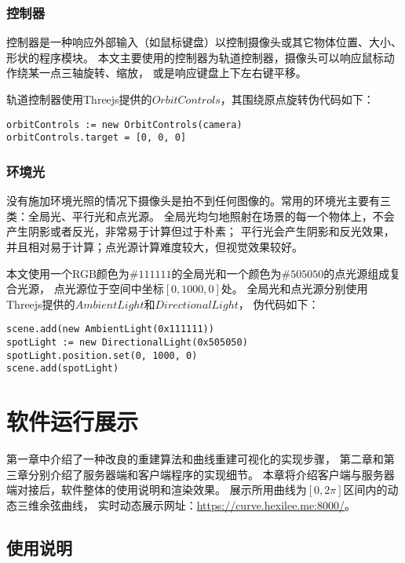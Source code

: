 \subsubsection{控制器}
控制器是一种响应外部输入（如鼠标键盘）以控制摄像头或其它物体位置、大小、形状的程序模块。
本文主要使用的控制器为轨道控制器，摄像头可以响应鼠标动作绕某一点三轴旋转、缩放，
或是响应键盘上下左右键平移。

轨道控制器使用Threejs提供的$OrbitControls$，其围绕原点旋转伪代码如下：

\begin{lstlisting}[caption={轨道控制器}]
orbitControls := new OrbitControls(camera)
orbitControls.target = [0, 0, 0]
\end{lstlisting}

\subsubsection{环境光}

没有施加环境光照的情况下摄像头是拍不到任何图像的。常用的环境光主要有三类：全局光、平行光和点光源。
全局光均匀地照射在场景的每一个物体上，不会产生阴影或者反光，非常易于计算但过于朴素；
平行光会产生阴影和反光效果，并且相对易于计算；点光源计算难度较大，但视觉效果较好。

本文使用一个RGB颜色为$\#111111$的全局光和一个颜色为$\#505050$的点光源组成复合光源，
点光源位于空间中坐标$[0, 1000, 0]$处。
全局光和点光源分别使用Threejs提供的$AmbientLight$和$DirectionalLight$，
伪代码如下：

\begin{lstlisting}[caption={环境光}]
scene.add(new AmbientLight(0x111111))
spotLight := new DirectionalLight(0x505050)
spotLight.position.set(0, 1000, 0)
scene.add(spotLight)
\end{lstlisting}

\clearpage

\section{软件运行展示}
第一章中介绍了一种改良的重建算法和曲线重建可视化的实现步骤，
第二章和第三章分别介绍了服务器端和客户端程序的实现细节。
本章将介绍客户端与服务器端对接后，软件整体的使用说明和渲染效果。
展示所用曲线为$[0, 2\pi]$区间内的动态三维余弦曲线，
实时动态展示网址：\href{https://curve.hexilee.me:8000/}{https://curve.hexilee.me:8000/}。

\subsection{使用说明}

